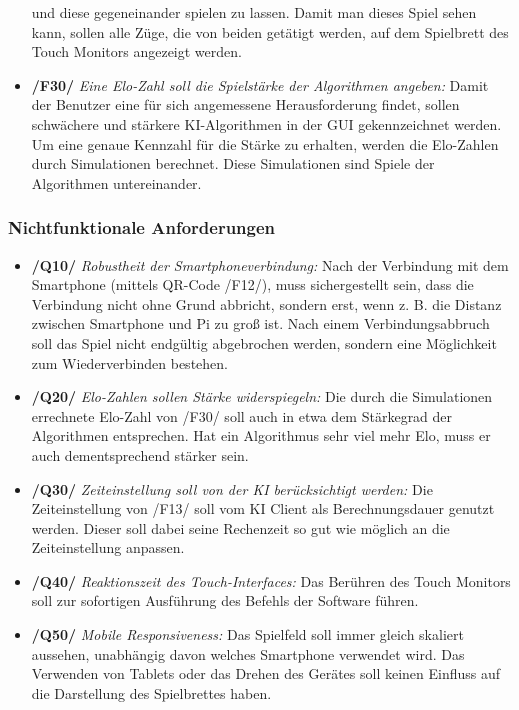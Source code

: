 \documentclass[12pt,a4paper,bibliography=totocnumbered,listof=totocnumbered]{article}
\begin{document}
\begin{appendix}
\begin{itemize}
        und diese gegeneinander spielen zu lassen. Damit man dieses Spiel sehen kann, sollen alle Züge, die 
        von beiden getätigt werden, auf dem Spielbrett des Touch Monitors angezeigt werden.
    \item \textbf{/F30/} \textit{Eine Elo-Zahl soll die Spielstärke der Algorithmen angeben:} Damit der Benutzer eine für sich angemessene Herausforderung findet,
        sollen schwächere und stärkere \ac{KI}-Algorithmen in der \ac{GUI} gekennzeichnet werden. Um eine genaue Kennzahl für die Stärke zu erhalten, werden die Elo-Zahlen durch
        Simulationen berechnet. Diese Simulationen sind Spiele der Algorithmen untereinander.
   
\end{itemize}
\subsubsection{Nichtfunktionale Anforderungen}
\begin{itemize}
    \item \textbf{/Q10/} \textit{Robustheit der Smartphoneverbindung:} Nach der Verbindung mit dem Smartphone (mittels QR-Code /F12/), muss sichergestellt sein, dass die Verbindung nicht ohne
        Grund abbricht, sondern erst, wenn z. B. die Distanz zwischen Smartphone und Pi zu groß ist. Nach einem Verbindungsabbruch soll 
        das Spiel nicht endgültig abgebrochen werden, sondern eine Möglichkeit zum Wiederverbinden bestehen.
    \item \textbf{/Q20/} \textit{Elo-Zahlen sollen Stärke widerspiegeln:} Die durch die Simulationen errechnete Elo-Zahl von /F30/ soll auch in etwa dem Stärkegrad der Algorithmen entsprechen.
        Hat ein Algorithmus sehr viel mehr Elo, muss er auch dementsprechend stärker sein.
    \item \textbf{/Q30/} \textit{Zeiteinstellung soll von der \ac{KI} berücksichtigt werden:} Die Zeiteinstellung von /F13/ soll vom \ac{KI} Client als Berechnungsdauer genutzt werden.
        Dieser soll dabei seine Rechenzeit so gut wie möglich an die Zeiteinstellung anpassen.
    \item \textbf{/Q40/} \textit{Reaktionszeit des Touch-Interfaces:} Das Berühren des Touch Monitors soll zur sofortigen Ausführung des Befehls der Software führen.
    \item \textbf{/Q50/} \textit{Mobile Responsiveness:} Das Spielfeld soll immer gleich skaliert aussehen, unabhängig davon welches Smartphone verwendet wird. 
        Das Verwenden von Tablets oder das Drehen des Gerätes soll keinen Einfluss auf die Darstellung des Spielbrettes haben.
\end{itemize}

\end{appendix}
\end{document}
